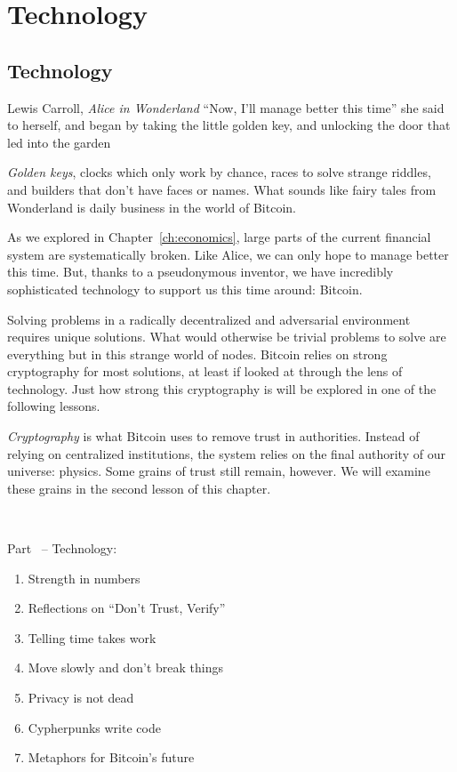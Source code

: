 \part{Technology}
\label{ch:technology}
\chapter*{Technology}

\begin{chapquote}{Lewis Carroll, \textit{Alice in Wonderland}}
\enquote{Now, I'll manage better this time} she said to herself, and began by taking
the little golden key, and unlocking the door that led into the garden
\end{chapquote}

\textit{Golden keys}, clocks which only work by chance, races to solve
strange riddles, and builders that don't have faces or names. What sounds like
fairy tales from Wonderland is daily business in the world of Bitcoin.

As we explored in Chapter~\ref{ch:economics}, large parts of the current financial
system are systematically broken. Like Alice, we can only hope to manage better
this time. But, thanks to a pseudonymous inventor, we have incredibly
sophisticated technology to support us this time around: Bitcoin.

Solving problems in a radically decentralized and adversarial environment
requires unique solutions. What would otherwise be trivial problems to solve
are everything but in this strange world of nodes. Bitcoin relies on strong
cryptography for most solutions, at least if looked at through the lens of
technology. Just how strong this cryptography is will be explored in one of the
following lessons.

\textit{Cryptography} is what Bitcoin uses to remove trust in authorities.
Instead of relying on centralized institutions, the system relies on the final
authority of our universe: physics. Some grains of trust still remain, however.
We will examine these grains in the second lesson of this chapter.

~

Part~\ref{ch:technology} -- Technology:

\begin{enumerate}
  \item Strength in numbers
  \item Reflections on \enquote{Don't Trust, Verify}
  \item Telling time takes work
  \item Move slowly and don't break things
  \item Privacy is not dead
  \item Cypherpunks write code
  \item Metaphors for Bitcoin's future
\end{enumerate}


